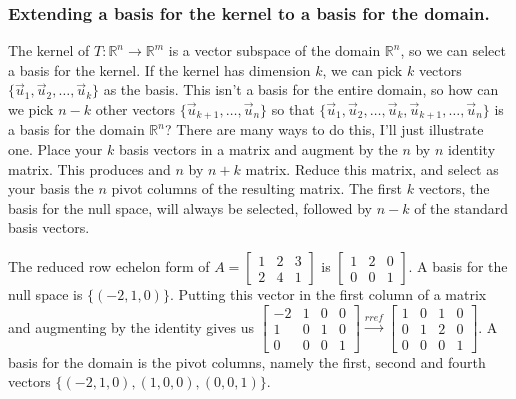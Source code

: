 \subsubsection{Extending a basis for the kernel to a basis for the domain.}
The kernel of $T\colon{\mathbb{R}}^n\to{\mathbb{R}}^m$ is a vector subspace of the domain ${\mathbb{R}}^n$, so we can select a basis for the kernel. 
If the kernel has dimension $k$, we can pick $k$ vectors $\{\vec u_1, \vec u_2,\ldots, \vec u_k\}$ as the basis. 
This isn't a basis for the entire domain, so how can we pick $n-k$ other vectors $\{\vec u_{k+1},\ldots, \vec u_n\}$ so that $\{\vec u_1, \vec u_2,\ldots, \vec u_k,\vec u_{k+1},\ldots, \vec u_n\}$ is a basis for the domain ${\mathbb{R}}^n$? 
There are many ways to do this, I'll just illustrate one.  
Place your $k$ basis vectors in a matrix and augment by the $n$ by $n$ identity matrix.  This produces and $n$ by $n+k$ matrix.  Reduce this matrix, and select as your basis the $n$ pivot columns of the resulting matrix. The first $k$ vectors, the basis for the null space, will always be selected, followed by $n-k$ of the standard basis vectors.

\begin{example}
The reduced row echelon form of 
$A=
\begin{bmatrix}
 1 & 2 & 3 \\
 2 & 4 & 1
\end{bmatrix}
$
is
$
\begin{bmatrix}
 1 & 2 & 0 \\
 0 & 0 & 1
\end{bmatrix}
$.  A basis for the null space is $\{(-2,1,0)\}$. 
Putting this vector in the first column of a matrix and augmenting by the identity gives us 
$
\begin{bmatrix}
 -2 & 1 & 0 & 0 \\
 1 & 0 & 1 & 0 \\
 0 & 0 & 0 & 1\end{bmatrix}
\xrightarrow{rref}
\begin{bmatrix}
 1 & 0 & 1 & 0 \\
 0 & 1 & 2 & 0 \\
 0 & 0 & 0 & 1
\end{bmatrix}
$.
A basis for the domain is the pivot columns, namely the first, second and fourth vectors $\{(-2,1,0),(1,0,0), (0,0,1)\}$. 

\end{example}


